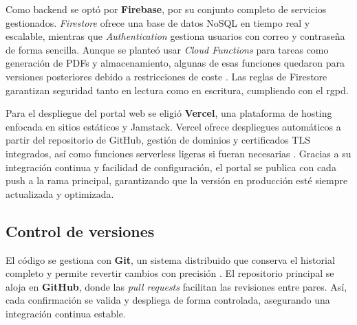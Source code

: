 \begin{large}

Como backend se optó por \textbf{Firebase}, por su conjunto completo de servicios gestionados. \textit{Firestore} ofrece una base de datos NoSQL en tiempo real y escalable, mientras que \textit{Authentication} gestiona usuarios con correo y contraseña de forma sencilla. Aunque se planteó usar \textit{Cloud Functions} para tareas como generación de PDFs y almacenamiento, algunas de esas funciones quedaron para versiones posteriores debido a restricciones de coste \cite{firebase_docs2025}. Las reglas de Firestore garantizan seguridad tanto en lectura como en escritura, cumpliendo con el \gls{rgpd}.

Para el despliegue del portal web se eligió \textbf{Vercel}, una plataforma de hosting enfocada en sitios estáticos y Jamstack. Vercel ofrece despliegues automáticos a partir del repositorio de GitHub, gestión de dominios y certificados TLS integrados, así como funciones serverless ligeras si fueran necesarias \cite{vercel_docs2025}. Gracias a su integración continua y facilidad de configuración, el portal se publica con cada push a la rama principal, garantizando que la versión en producción esté siempre actualizada y optimizada.

\end{large}

\subsection{Control de versiones}

\begin{large}

El código se gestiona con \textbf{Git}, un sistema distribuido que conserva el historial completo y permite revertir cambios con precisión \cite{git_book2023}. El repositorio principal se aloja en \textbf{GitHub}, donde las \emph{pull requests} facilitan las revisiones entre pares. Así, cada confirmación se valida y despliega de forma controlada, asegurando una integración continua estable.

\end{large}
